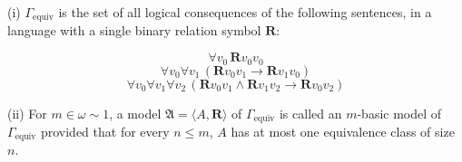 (i) $\Gamma_{\text{equiv}}$ is the set of all logical consequences of the following sentences, in a language with a single binary relation symbol $\mathbf{R}$:

$$\forall v_0 \, \mathbf{R}v_0v_0$$
$$\forall v_0 \forall v_1 \, (\mathbf{R}v_0v_1 \rightarrow \mathbf{R}v_1v_0)$$
$$\forall v_0 \forall v_1 \forall v_2 \, (\mathbf{R}v_0v_1 \wedge \mathbf{R}v_1v_2 \rightarrow \mathbf{R}v_0v_2)$$

(ii) For $m \in \omega \sim 1$, a model $\mathfrak{A} = \langle A, \mathbf{R} \rangle$ of $\Gamma_{\text{equiv}}$ is called an $m$-basic model of $\Gamma_{\text{equiv}}$ provided that for every $n \leq m$, $A$ has at most one equivalence class of size $n$.
